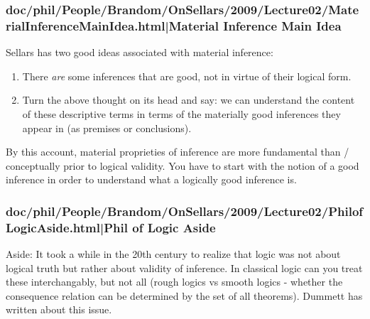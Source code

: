 \documentclass[12pt,a4paper]{report}
\begin{document}
\subsubsection{doc/phil/People/Brandom/OnSellars/2009/Lecture02/MaterialInferenceMainIdea.html|Material Inference Main Idea}

Sellars has two good ideas associated with material inference:
\begin{enumerate}
\item There \emph{are} some inferences that are good, not in virtue of their logical form.
\item Turn the above thought on its head and say: we can understand the content of these descriptive terms in terms of the materially good inferences they appear in (as premises or conclusions).
\end{enumerate}


By this account, material proprieties of inference are more fundamental than / conceptually prior to logical validity. You have to start with the notion of a good inference in order to understand what a logically good inference is.

\subsubsection{doc/phil/People/Brandom/OnSellars/2009/Lecture02/PhilofLogicAside.html|Phil of Logic Aside}

Aside: It took a while in the 20th century to realize that logic was not about
logical truth but rather about validity of inference. In classical logic can
you treat these interchangably, but not all (rough logics vs smooth logics -
whether the consequence relation can be determined by the set of all theorems).
Dummett has written about this issue.
\end{document}
